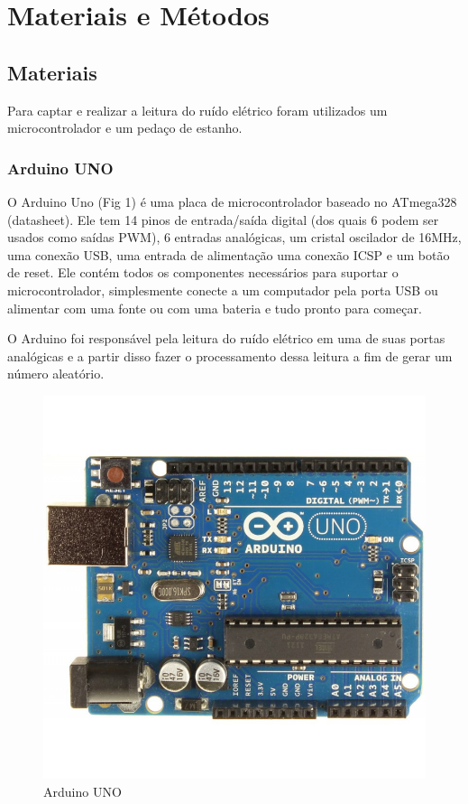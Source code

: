 \section{Materiais e Métodos}
\subsection{Materiais}
Para captar e realizar a leitura do ruído elétrico foram utilizados um microcontrolador e um pedaço de estanho.
\subsubsection{Arduino UNO}
O Arduino Uno (Fig 1) é uma placa de microcontrolador baseado no ATmega328 (datasheet). Ele tem 14 pinos de entrada/saída digital (dos quais 6 podem ser usados como saídas PWM), 6 entradas analógicas, um cristal oscilador de 16MHz, uma conexão USB, uma entrada de alimentação uma conexão ICSP e um botão de reset. Ele contém todos os componentes necessários para suportar o microcontrolador, simplesmente conecte a um computador pela porta USB ou alimentar com uma fonte ou com uma bateria e tudo pronto para começar.

O Arduino foi responsável pela leitura do ruído elétrico em uma de suas portas analógicas e a partir disso fazer o processamento dessa leitura a fim de gerar um número aleatório.

\begin{figure}[H]
	\label{fig1}
	\begin{centering}
		\includegraphics[width = 400pt]{img/arduino.jpg}
		\caption{Arduino UNO}
	\end{centering}	
		
\end{figure}

